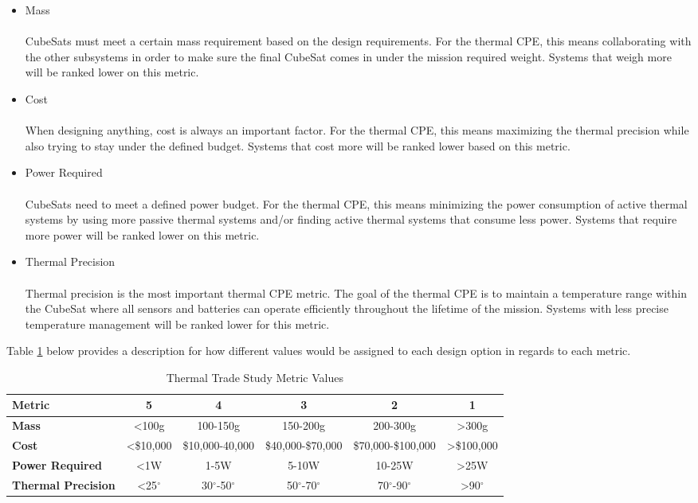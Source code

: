 \documentclass{ece}
\begin{document}
\begin{itemize}
   \item Mass \\
   \\
CubeSats must meet a certain mass requirement based on the design requirements. For the thermal CPE, this means collaborating with the other subsystems in order to make sure the final CubeSat comes in under the mission required weight. Systems that weigh more will be ranked lower on this metric.
   \item Cost \\
   \\
When designing anything, cost is always an important factor. For the thermal CPE, this means maximizing the thermal precision while also trying to stay under the  defined budget. Systems that cost more will be ranked lower based on this metric.
   \item Power Required \\
   \\
CubeSats need to meet a defined power budget. For the thermal CPE, this means minimizing the power consumption of active thermal systems by using more passive thermal systems and/or finding active thermal systems that consume less power. Systems that require more power will be ranked lower on this metric.
   \item Thermal Precision \\
   \\
Thermal precision is the most important thermal CPE metric. The goal of the thermal CPE is to maintain a temperature range within the CubeSat where all sensors and batteries can operate efficiently throughout the lifetime of the mission. Systems with less precise temperature management will be ranked lower for this metric.
\end{itemize}

Table \ref{tbl:Thermal_Metric_Scores} below provides a description for how different values would be assigned to each design option in regards to each metric. 

\begin{table}[H]
\centering
\begin{tabular}{|l|c|c|c|c|c|} 
\hline
    \textbf{Metric} & \textbf{5} & \textbf{4} & \textbf{3} & \textbf{2} & \textbf{1}
    \\
\hline
    \textbf{Mass} & <100g & 100-150g & 150-200g & 200-300g & >300g 
    \\
\hline
    \textbf{Cost} & <\$10,000 & \$10,000-40,000 & \$40,000-\$70,000 & \$70,000-\$100,000 & >\$100,000
    \\
\hline
    \textbf{Power Required} & <1W & 1-5W & 5-10W & 10-25W & >25W 
    \\
\hline
    \textbf{Thermal Precision} & <25$^{\circ}$  & 30$^{\circ}$-50$^{\circ}$ & 50$^{\circ}$-70$^{\circ}$ & 70$^{\circ}$-90$^{\circ}$ & >90$^{\circ}$ 
    \\
\hline
\end{tabular}
\caption{Thermal Trade Study Metric Values}
\label{tbl:Thermal_Metric_Scores}
\end{table}
\end{document}
